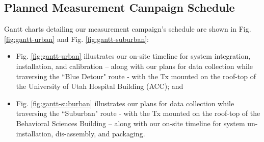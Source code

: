 \documentclass[12pt]{article}
\begin{document}
    \subsection{Planned Measurement Campaign Schedule}
        Gantt charts detailing our measurement campaign's schedule are shown in Fig. \ref{fig:gantt-urban} and Fig. \ref{fig:gantt-suburban}: 
        \begin{itemize}
            \item Fig. \ref{fig:gantt-urban} illustrates our on-site timeline for system integration, installation, and calibration -- along with our plans for data collection while traversing the ``Blue Detour" route - with the Tx mounted on the roof-top of the University of Utah Hospital Building (ACC); and
            \item Fig. \ref{fig:gantt-suburban} illustrates our plans for data collection while traversing the ``Suburban" route - with the Tx mounted on the roof-top of the Behavioral Sciences Building -- along with our on-site timeline for system un-installation, dis-assembly, and packaging.
        \end{itemize}
    
\end{document}
